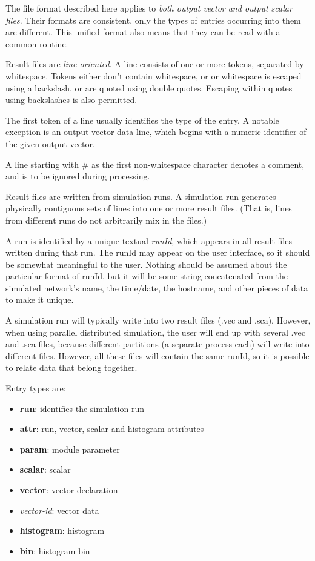 \label{cha:result-file-formats}

The file format described here applies to \textit{both output vector and
output scalar files}. Their formats are consistent, only the types of
entries occurring into them are different. This unified format also
means that they can be read with a common routine.

Result files are \textit{line oriented}. A line consists of one or more
tokens, separated by whitespace. Tokens either don't
contain whitespace, or or whitespace is escaped using a backslash, or
are quoted using double quotes. Escaping within quotes using
backslashes is also permitted.

The first token of a line usually identifies the type of the entry. A
notable exception is an output vector data line, which begins with a
numeric identifier of the given output vector.

A line starting with \# as the first non{}-whitespace character denotes
a comment, and is to be ignored during processing.

Result files are written from simulation runs. A simulation run
generates physically contiguous sets of lines into one or more result
files. (That is, lines from different runs do not arbitrarily mix in
the files.)

A run is identified by a unique textual\textit{ runId}, which appears in
all result files written during that run. The runId may appear on the
user interface, so it should be somewhat meaningful to the user.
Nothing should be assumed about the particular format of runId, but it
will be some string concatenated from the simulated network's name, the
time/date, the hostname, and other pieces of data to make it unique.

A simulation run will typically write into two result files (.vec and
.sca). However, when using parallel distributed simulation, the user
will end up with several .vec and .sca files, because different
partitions (a separate process each) will write into different files.
However, all these files will contain the same runId, so it is possible
to relate data that belong together.

Entry types are:

\begin{itemize}
    \item{\textbf{run}: identifies the simulation run}
    \item{\textbf{attr}: run, vector, scalar and histogram attributes}
    \item{\textbf{param}: module parameter}
    \item{\textbf{scalar}: scalar}
    \item{\textbf{vector}: vector declaration}
    \item{\textit{vector-id}: vector data}
    \item{\textbf{histogram}: histogram}
    \item{\textbf{bin}: histogram bin}
\end{itemize}



